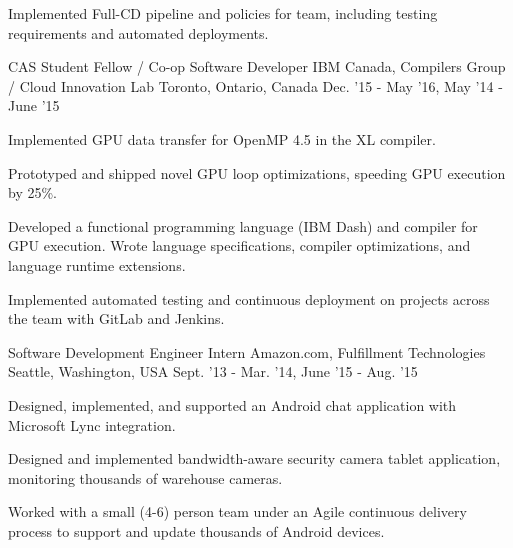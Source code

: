 \begin{cventries}
{\begin{cvitems}
            \item Implemented Full-CD pipeline and policies for team, including testing requirements and automated deployments.
        \end{cvitems}
    }
\vspace{4mm}
\cventry
    {CAS Student Fellow / Co-op Software Developer} %
    {IBM Canada, Compilers Group / Cloud Innovation Lab} %
    {Toronto, Ontario, Canada} %
    {Dec. '15 - May '16, May '14 - June '15} %
    {
        \begin{cvitems}
            \item Implemented GPU data transfer for OpenMP 4.5 in the XL compiler.
            \item Prototyped and shipped novel GPU loop optimizations, speeding GPU execution by 25\%.
            \item Developed a functional programming language (IBM Dash) and compiler for GPU execution. Wrote language specifications, compiler optimizations, and language runtime extensions.
            \item Implemented automated testing and continuous deployment on projects across the team with GitLab and Jenkins.
        \end{cvitems}
    }
\vspace{4mm}
\cventry
    {Software Development Engineer Intern} %
    {Amazon.com, Fulfillment Technologies} %
    {Seattle, Washington, USA} %
    {Sept. '13 - Mar. '14,
    June '15 - Aug. '15} %
    {
        \begin{cvitems}
            \item Designed, implemented, and supported an Android chat application with Microsoft Lync integration.
            \item Designed and implemented bandwidth-aware security camera tablet application, monitoring thousands of warehouse cameras.
            \item Worked with a small (4-6) person team under an Agile continuous delivery process to support and update thousands of Android devices.
        \end{cvitems}
    }
\end{cventries}
